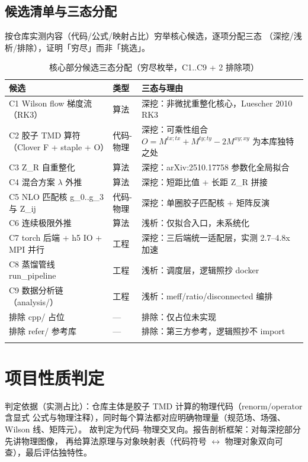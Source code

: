 \documentclass[UTF8]{ctexart}
\begin{document}
\subsection{候选清单与三态分配}
\label{sec:list}
按仓库实测内容（代码/公式/映射占比）穷举核心候选，逐项分配三态
（\textcolor{struct}{深挖}/浅析/\textcolor{warn}{排除}），证明「穷尽」而非「挑选」。
\begin{xltabular}{\textwidth}{llX}
\toprule
\textcolor{struct}{候选} & 类型 & 三态与理由 \\
\midrule
\endhead
C1 Wilson flow 梯度流（RK3） & 算法 & \textcolor{struct}{深挖}：非微扰重整化核心，Luescher 2010 RK3 \\
C2 胶子 TMD 算符（Clover F + staple + O） & 代码-物理 & \textcolor{struct}{深挖}：可乘性组合 $O=M^{tx;tx}+M^{ty;ty}-2M^{xy;xy}$ 为本库独特之处 \\
C3 Z\_R 自重整化 & 算法 & \textcolor{struct}{深挖}：arXiv:2510.17758 参数化全局拟合 \\
C4 混合方案 $\lambda$ 外推 & 算法 & \textcolor{struct}{深挖}：短距比值 + 长距 Z\_R 拼接 \\
C5 NLO 匹配核 g\_0..g\_3 与 Z\_ij & 代码-物理 & \textcolor{struct}{深挖}：单圈胶子匹配核 + 矩阵反演 \\
C6 连续极限外推 & 算法 & 浅析：仅拟合入口，未系统化 \\
C7 torch 后端 + h5 IO + MPI 并行 & 工程 & \textcolor{struct}{深挖}：三后端统一适配层，实测 2.7--4.8x 加速 \\
C8 蒸馏管线 run\_pipeline & 工程 & 浅析：调度层，逻辑照抄 docker \\
C9 数据分析链（analysis/） & 工程 & 浅析：meff/ratio/disconnected 编排 \\
排除 cpp/ 占位 & --- & \textcolor{warn}{排除}：仅占位未实现 \\
排除 refer/ 参考库 & --- & \textcolor{warn}{排除}：第三方参考，逻辑照抄不 import \\
\bottomrule
\caption{核心部分候选三态分配（穷尽枚举，C1..C9 + 2 排除项）}
\end{xltabular}

\section{项目性质判定}
\label{sec:nature}
判定依据（实测占比）：仓库主体是胶子 TMD 计算的物理代码（renorm/operator 含显式
公式与物理注释），同时每个算法都对应明确物理量（规范场、场强、Wilson 线、矩阵元）。
故判定为\textcolor{idea}{代码--物理交叉向}。报告剖析框架：对每深挖部分先讲物理图像，
再给算法原理与对象映射表（代码符号 $\leftrightarrow$ 物理对象双向可查），最后评估独特性。
\end{document}
